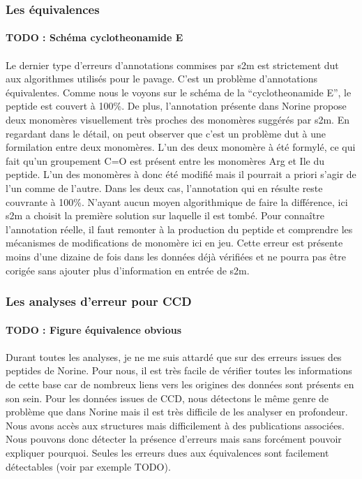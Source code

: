 \documentclass[12pt,french,twoside]{report}
\begin{document}
\subsubsection{Les équivalences}

\paragraph{TODO : Schéma cyclotheonamide E}

\paragraph{}Le dernier type d'erreurs d'annotations commises par s2m est strictement dut aux algorithmes utilisés pour le pavage.
C'est un problème d'annotations équivalentes.
Comme nous le voyons sur le schéma de la ``cyclotheonamide E'', le peptide est couvert à 100\%.
De plus, l'annotation présente dans Norine propose deux monomères visuellement très proches des monomères suggérés par s2m.
En regardant dans le détail, on peut observer que c'est un problème dut à une formilation entre deux monomères.
L'un des deux monomère à été formylé, ce qui fait qu'un groupement C=O est présent entre les monomères Arg et Ile du peptide.
L'un des monomères à donc été modifié mais il pourrait a priori s'agir de l'un comme de l'autre.
Dans les deux cas, l'annotation qui en résulte reste couvrante à 100\%.
N'ayant aucun moyen algorithmique de faire la différence, ici s2m a choisit la première solution sur laquelle il est tombé.
Pour connaître l'annotation réelle, il faut remonter à la production du peptide et comprendre les mécanismes de modifications de monomère ici en jeu.
Cette erreur est présente moins d'une dizaine de fois dans les données déjà vérifiées et ne pourra pas être corigée sans ajouter plus d'information en entrée de s2m.


\subsubsection{Les analyses d'erreur pour CCD}

\paragraph{TODO : Figure équivalence obvious}

\paragraph{}Durant toutes les analyses, je ne me suis attardé que sur des erreurs issues des peptides de Norine.
Pour nous, il est très facile de vérifier toutes les informations de cette base car de nombreux liens vers les origines des données sont présents en son sein.
Pour les données issues de CCD, nous détectons le même genre de problème que dans Norine mais il est très difficile de les analyser en profondeur.
Nous avons accès aux structures mais difficilement à des publications associées.
Nous pouvons donc détecter la présence d'erreurs mais sans forcément pouvoir expliquer pourquoi.
Seules les erreurs dues aux équivalences sont facilement détectables (voir par exemple TODO).
\end{document}
